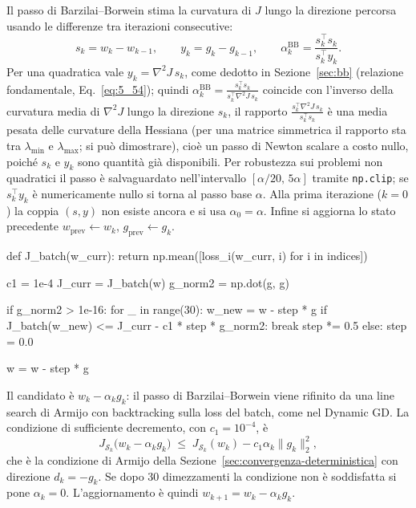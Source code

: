 \documentclass[a4paper,12pt]{article}
\numberwithin{equation}{section}
\numberwithin{figure}{section}
\numberwithin{table}{section}
\begin{document}
Il passo di Barzilai--Borwein stima la curvatura di $J$ lungo la direzione
percorsa usando le differenze tra iterazioni consecutive:
\[
s_k = w_k - w_{k-1}, \qquad y_k = g_k - g_{k-1}, \qquad
\alpha_k^{\mathrm{BB}} = \frac{s_k^{\top} s_k}{s_k^{\top} y_k}.
\]
Per una quadratica vale $y_k = \nabla^2 J\, s_k$, come dedotto in
Sezione~\ref{sec:bb} (relazione fondamentale, Eq.~\eqref{eq:5_54}); quindi
$\alpha_k^{\mathrm{BB}} = \frac{s_k^\top s_k}{s_k^\top \nabla^2 J\, s_k}$
coincide con l'inverso della curvatura media di $\nabla^2 J$ lungo la direzione
$s_k$, il rapporto $\frac{s_k^\top \nabla^2 J\, s_k}{s_k^\top s_k}$ è una
media pesata delle curvature della Hessiana (per una matrice simmetrica il
rapporto sta tra $\lambda_{\min}$ e $\lambda_{\max}$; si può dimostrare),
cioè un passo di Newton scalare a costo nullo, poiché $s_k$ e $y_k$ sono quantità
già disponibili. Per robustezza sui problemi
non quadratici il passo è salvaguardato nell'intervallo $[\alpha/20,\,5\alpha]$
tramite \texttt{np.clip}; se $s_k^{\top}y_k$ è numericamente nullo si torna al
passo base $\alpha$. Alla prima iterazione ($k=0$) la coppia $(s,y)$ non esiste
ancora e si usa $\alpha_0 = \alpha$. Infine si aggiorna lo stato precedente
$w_{\text{prev}} \leftarrow w_k$, $g_{\text{prev}} \leftarrow g_k$.

\begin{pythoncode}[title= BB-CCV]

        def J_batch(w_curr):
            return np.mean([loss_i(w_curr, i) for i in indices])

        c1 = 1e-4
        J_curr = J_batch(w)
        g_norm2 = np.dot(g, g)

        if g_norm2 > 1e-16:
            for _ in range(30):
                w_new = w - step * g
                if J_batch(w_new) <= J_curr - c1 * step * g_norm2:
                    break
                step *= 0.5
            else:
                step = 0.0

        w = w - step * g
\end{pythoncode}

Il candidato è $w_k - \alpha_k g_k$: il passo di Barzilai--Borwein viene
rifinito da una line search di Armijo con backtracking sulla loss del batch,
come nel Dynamic GD. La condizione di sufficiente decremento, con
$c_1 = 10^{-4}$, è
\[
J_{\mathcal{S}_k}\bigl(w_k - \alpha_k g_k\bigr) \;\le\;
J_{\mathcal{S}_k}(w_k) - c_1 \alpha_k \|g_k\|_2^2,
\]
che è la condizione di Armijo della Sezione~\ref{sec:convergenza-deterministica}
con direzione $d_k = -g_k$. Se dopo 30 dimezzamenti la condizione non è
soddisfatta si pone $\alpha_k = 0$. L'aggiornamento è quindi
$w_{k+1} = w_k - \alpha_k g_k$.
\end{document}
